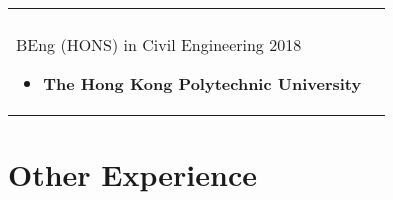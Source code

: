 \documentclass[a4paper,11pt]{article}
\begin{document}
\begin{tabularx}{\linewidth}{@{}l X@{}}
\begin{minipage}[t]{\linewidth}
    
    
    \end{minipage} \\[10px]
    
    \begin{minipage}[t]{\linewidth}
    BEng (HONS) in Civil Engineering  \hfill\normalsize 2018
    
      \begin{itemize}[nosep,after=\strut, leftmargin=1em, itemsep=3pt]
           \item\textbf{\small{The Hong Kong Polytechnic University}} 
    \end{itemize}
      
    
    
    \end{minipage} \\[10px]
    
\end{tabularx}


\section{Other Experience}
\end{document}
